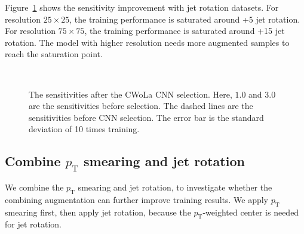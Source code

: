 \documentclass[12pt]{article}
\begin{document}
		Figure~\ref{fig:sensitivity_improvement_origin_jet_aug_SB_1_3} shows the sensitivity improvement with jet rotation datasets. For resolution $25\times 25$, the training performance is saturated around +5 jet rotation. For resolution $75\times 75$, the training performance is saturated around +15 jet rotation. The model with higher resolution needs more augmented samples to reach the saturation point.
		\begin{figure}[htpb]
			\centering
			 \\
			\caption{The sensitivities after the CWoLa CNN selection. Here, $1.0$ and $3.0$ are the sensitivities before selection. The dashed lines are the sensitivities before CNN selection. The error bar is the standard deviation of 10 times training.}
			\label{fig:sensitivity_improvement_origin_jet_aug_SB_1_3}
		\end{figure}
	\subsection{Combine \texorpdfstring{$p_{\mathrm{T}}$}{pT} smearing and jet rotation}%
	\label{sub:combine_pt_smearing_and_jet_rotation}
		We combine the $p_{\text{T}}$ smearing and jet rotation, to investigate whether the combining augmentation can further improve training results. We apply $p_{\text{T}}$ smearing first, then apply jet rotation, because the $p_{\text{T}}$-weighted center is needed for jet rotation.
\end{document}
